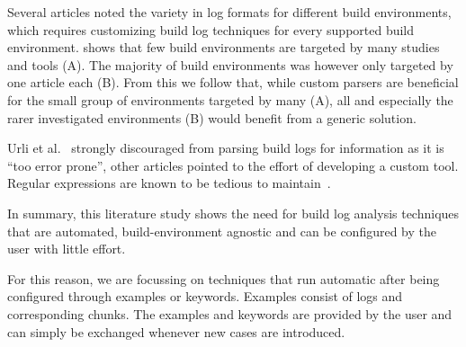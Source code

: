 Several articles noted the variety in log formats for different build
environments, which requires customizing build log techniques for
every supported build environment.
 shows that few build environments are
targeted by many studies and tools (A).
The majority of build environments was however only targeted by one
article each (B).
From this we follow that, while custom parsers are beneficial for the
small group of environments targeted by many (A), all and especially
the rarer investigated environments (B) would benefit from a generic
solution.

Urli et al.~\cite{urli2018design} strongly discouraged from parsing
build logs for information as it is ``too error prone'', other
articles pointed to the effort of developing a custom tool.
Regular expressions are known to be tedious to
maintain~\cite{michael2019regexes}.


In summary, this literature study shows the need for build log
analysis techniques that are automated, build-environment agnostic
and can be configured by the user with little effort.

For this reason, we are focussing on techniques that run automatic
after being configured through examples or keywords.
Examples consist of logs and corresponding chunks.
The examples and keywords are provided by the user and can simply be
exchanged whenever new cases are introduced.

